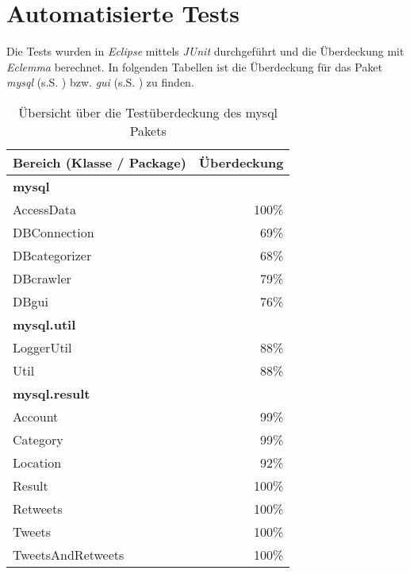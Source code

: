 \section{Automatisierte Tests}
Die Tests wurden in \emph{Eclipse} mittels \emph{JUnit} durchgeführt und die Überdeckung mit \emph{Eclemma} berechnet.
In folgenden Tabellen ist die Überdeckung für das Paket \emph{mysql} (s.S. \pageref{tbl:coverageMysql}) bzw. \emph{gui} 
(s.S. \pageref{tbl:coverageGui}) zu finden.
\begin{table}[h]
\centering
\begin{tabular} {l||r}
\label{tbl:coverageMysql}
	Bereich (Klasse / Package) & Überdeckung \\
	\hline
	\hline
	\textbf{mysql} &  \\
		\hspace*{3mm}AccessData & 100\% \\
		\hspace*{3mm}DBConnection & 69\% \\
		\hspace*{3mm}DBcategorizer & 68\% \\
		\hspace*{3mm}DBcrawler & 79\% \\
		\hspace*{3mm}DBgui & 76\% \\
		\hline
	\textbf{mysql.util} &  \\
		\hspace*{3mm}LoggerUtil & 88\% \\
		\hspace*{3mm}Util & 88\% \\
		\hline
	\textbf{mysql.result} &  \\
		\hspace*{3mm}Account & 99\% \\
		\hspace*{3mm}Category & 99\% \\
		\hspace*{3mm}Location & 92\% \\
		\hspace*{3mm}Result & 100\% \\
		\hspace*{3mm}Retweets & 100\% \\
		\hspace*{3mm}Tweets & 100\% \\
		\hspace*{3mm}TweetsAndRetweets & 100\% \\
	\end{tabular}
	\caption{Übersicht über die Testüberdeckung des mysql Pakets}
\end{table}
